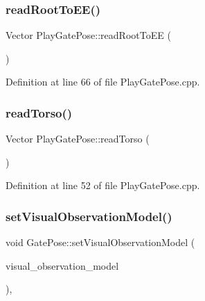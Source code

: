 \subsubsection{\texorpdfstring{read\+Root\+To\+E\+E()}{readRootToEE()}}
{\footnotesize\ttfamily Vector Play\+Gate\+Pose\+::read\+Root\+To\+EE (\begin{DoxyParamCaption}{ }\end{DoxyParamCaption})\hspace{0.3cm}{\ttfamily [protected]}}



Definition at line 66 of file Play\+Gate\+Pose.\+cpp.

\mbox{\label{classPlayGatePose_a9df2350244234bbd6cd3e32d2592eca4}} 
\subsubsection{\texorpdfstring{read\+Torso()}{readTorso()}}
{\footnotesize\ttfamily Vector Play\+Gate\+Pose\+::read\+Torso (\begin{DoxyParamCaption}{ }\end{DoxyParamCaption})\hspace{0.3cm}{\ttfamily [protected]}}



Definition at line 52 of file Play\+Gate\+Pose.\+cpp.

\mbox{\label{classGatePose_a18ba358c801ae1a246dbee2f9780c698}} 
\subsubsection{\texorpdfstring{set\+Visual\+Observation\+Model()}{setVisualObservationModel()}}
{\footnotesize\ttfamily void Gate\+Pose\+::set\+Visual\+Observation\+Model (\begin{DoxyParamCaption}\item[{std\+::unique\+\_\+ptr$<$ bfl\+::\+Visual\+Observation\+Model $>$}]{visual\+\_\+observation\+\_\+model }\end{DoxyParamCaption})\hspace{0.3cm}{\ttfamily [override]}, {\ttfamily [inherited]}}



